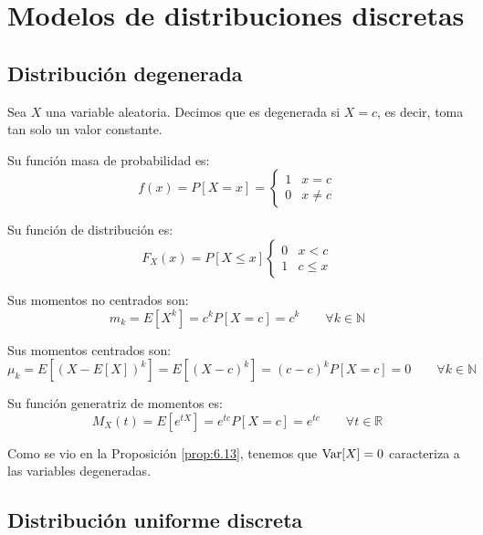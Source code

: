 \chapter{Modelos de distribuciones discretas}
\section{Distribución degenerada}

\begin{definicion}
    Sea $X$ una variable aleatoria. Decimos que es degenerada si $X=c$, es decir, toma tan solo un valor constante.
\end{definicion}

Su función masa de probabilidad es:
\begin{equation*}
    f(x) = P[X=x] = \left\{\begin{array}{cc}
        1 & x=c \\
        0 & x\neq c
    \end{array}\right.
\end{equation*}

Su función de distribución es:
\begin{equation*}
    F_X(x) = P[X\leq x] \left\{\begin{array}{cc}
        0 & x<c \\
        1 & c\leq x
    \end{array}\right.
\end{equation*}

Sus momentos no centrados son:
\begin{equation*}
    m_k = E[X^k] = c^kP[X=c] = c^k \qquad \forall k\in \mathbb{N}
\end{equation*}

Sus momentos centrados son:
\begin{equation*}
    \mu_k = E[(X-E[X])^k]
    = E[(X-c)^k] = (c-c)^kP[X=c] = 0    
    \qquad \forall k\in \mathbb{N}
\end{equation*}

Su función generatriz de momentos es:
\begin{equation*}
    M_X(t) = E[e^{tX}] = e^{tc}P[X=c] = e^{tc}    
    \qquad \forall t\in \mathbb{R}
\end{equation*}


Como se vio en la Proposición \ref{prop:6.13}, tenemos que $\operatorname{Var}[X]=0$ caracteriza a las variables degeneradas.

\section{Distribución uniforme discreta}

